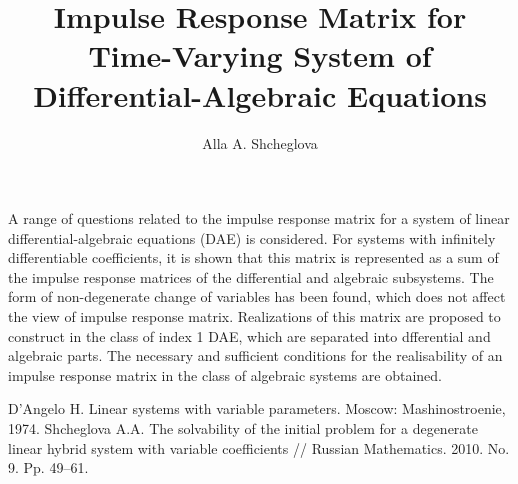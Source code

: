 \title{Impulse Response Matrix for Time-Varying System of Differential-Algebraic Equations}
\author{Alla A. Shcheglova}


\maketitle

\begin{abstract}
\end{abstract}


A range of questions related to the impulse response matrix \cite{reff1} for a system of linear differential-algebraic equations (DAE) \cite{reff2} is considered. For systems with infinitely differentiable coefficients, it is shown that this matrix is represented as a sum of the impulse response matrices of the differential and algebraic subsystems.  The form of  non-degenerate change of variables has been found, which does not affect the view of impulse response matrix.  Realizations of this matrix are proposed to construct  in the class of index 1 DAE, which are separated into dfferential and algebraic parts. The necessary and sufficient conditions for the realisability  of an impulse response matrix in the class of algebraic systems are obtained.

\begin{thebibliography}{9}
 { D'Angelo H.} Linear systems with variable parameters.  Moscow:  Mashinostroenie, 1974.  
 { Shcheglova A.A.} The solvability of the initial problem for a degenerate linear hybrid system with variable coefficients // Russian Mathematics.  2010. No. 9.  Pp. 49--61.  
\end{thebibliography}

